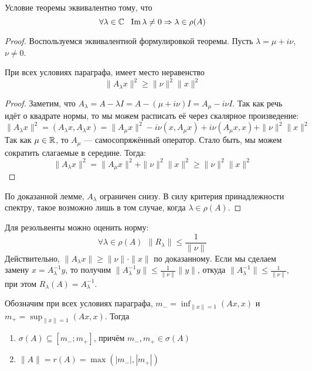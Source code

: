 \begin{note}
	Условие теоремы эквивалентно тому, что
	\[
		\forall \lambda \in \mathbb{C}\ \ \operatorname{Im} \lambda \neq 0 \Rightarrow \lambda \in \rho(A)
	\]
\end{note}

\begin{proof}
	Воспользуемся эквивалентной формулировкой теоремы. Пусть $\lambda = \mu + i\nu$, $\nu \neq 0$.
	\begin{lemma}
		При всех условиях параграфа, имеет место неравенство
		\[
			\|A_\lambda x\|^2 \ge \|\nu\|^2 \|x\|^2
		\]
	\end{lemma}
	
	\begin{proof}
		Заметим, что $A_\lambda = A - \lambda I = A - (\mu + i\nu)I = A_\mu - i\nu I$. Так как речь идёт о квадрате нормы, то мы можем расписать её через скалярное произведение:
		\[
			\|A_\lambda x\|^2 = (A_\lambda x, A_\lambda x) = \|A_\mu x\|^2 - i\nu(x, A_\mu x) + i\nu(A_\mu x, x) + \|\nu\|^2\|x\|^2
		\]
		Так как $\mu \in \mathbb{R}$, то $A_\mu$ --- самосопряжённый оператор. Стало быть, мы можем сократить слагаемые в середине. Тогда:
		\[
			\|A_\lambda x\|^2 = \|A_\mu x\|^2 + \|\nu\|^2\|x\|^2 \ge \|\nu\|^2\|x\|^2
		\]
	\end{proof}
	По доказанной лемме, $A_\lambda$ ограничен снизу. В силу критерия принадлежности спектру, такое возможно лишь в том случае, когда $\lambda \in \rho(A)$.
\end{proof}

\begin{note}
	Для резольвенты можно оценить норму:
	\[
		\forall \lambda \in \rho(A)\ \ \|R_\lambda\| \le \frac{1}{\|\nu\|}
	\]
	Действительно, $\|A_\lambda x\| \ge \|\nu\| \cdot \|x\|$ по доказанному. Если мы сделаем замену $x = A_\lambda^{-1}y$, то получим $\|A_\lambda^{-1}y\| \le \frac{1}{\|\nu\|}\|y\|$, откуда $\|A_\lambda^{-1}\| \le \frac{1}{\|\nu\|}$, при этом $R_\lambda(A) = A_\lambda^{-1}$.
\end{note}

\begin{theorem} \label{sao_spectre_bound}
	Обозначим при всех условиях параграфа, $m_- = \inf_{\|x\| = 1} (Ax, x)$ и $m_+ = \sup_{\|x\| = 1} (Ax, x)$. Тогда
	\begin{enumerate}
		\item $\sigma(A) \subseteq [m_-; m_+]$, причём $m_-, m_+ \in \sigma(A)$
		
		\item $\|A\| = r(A) = \max(|m_-|, |m_+|)$
	\end{enumerate}
\end{theorem}

